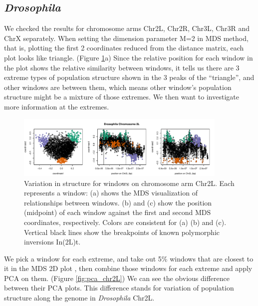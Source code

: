 \documentclass[11pt, oneside]{article}   	%
\begin{document}
\subsection{\textit{Drosophila}}
We checked the results for chromosome arms Chr2L, Chr2R, Chr3L, Chr3R and ChrX separately. When setting the dimension parameter M=2 in MDS method, that is, plotting the first 2 coordinates reduced from the distance matrix, each plot looks like triangle.
(Figure \ref{fig:mds_chr2L}a) Since the relative position for each window in the plot shows the relative similarity between windows, it tells us there are 3 extreme types of population structure shown in the 3 peaks of the ``triangle'', and other windows are between them, which means other window's population structure might be a mixture of those extremes. We then want to investigate more information at the extremes.

\begin{figure}
    \begin{center}
       \includegraphics[width=0.9\textwidth]{Fig1_Together_MDS_plot_Chr2L_final_abline}
    \end{center}
    \caption{
         Variation in structure for windows on chromosome arm Chr2L. 
         Each represents a window: (a) shows the MDS visualization of relationships between windows. 
         (b) and (c) show the position (midpoint) of each window against the first and second MDS coordinates, respectively. 
         Colors are consistent for (a) (b) and (c).
         Vertical black lines show the breakpoints of known polymorphic inversions In(2L)t.
         \label{fig:mds_chr2L}
    }
\end{figure}


We pick a window for each extreme, and take out 5\% windows that are closest to it in the MDS 2D plot , then combine those windows for each extreme and apply PCA on them. (Figure \ref{fig:pca_chr2L}) We can see the obvious difference between their PCA plots. This difference stands for variation of population structure along the genome in \textit{Drosophila} Chr2L.
\end{document}
